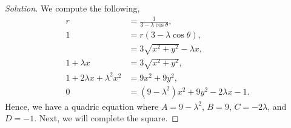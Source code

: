 \documentclass[letterpaper, 12pt]{amsart}
\theoremstyle{definition}  							%
\begin{document}
		\begin{proof}[Solution]
		We compute the following,
			\begin{align*}
				r &= \frac{1}{3-\lambda\cos\theta}, \\
				1 &= r(3-\lambda\cos\theta), \\
				&= 3\sqrt{x^2+y^2} - \lambda x, \\
				1 + \lambda x &= 3\sqrt{x^2+y^2}, \\
				1 + 2\lambda x + \lambda^2x^2 &= 9x^2 + 9y^2, \\
				0 &= \left( 9 - \lambda^2 \right)x^{2} + 9y^2 - 2\lambda x - 1.
			\end{align*}
		Hence, we have a quadric equation where $A = 9 - \lambda^2$, $B = 9$, $C = -2\lambda$, and $D = -1$.
		Next, we will complete the square.


\end{proof}
\end{document}

